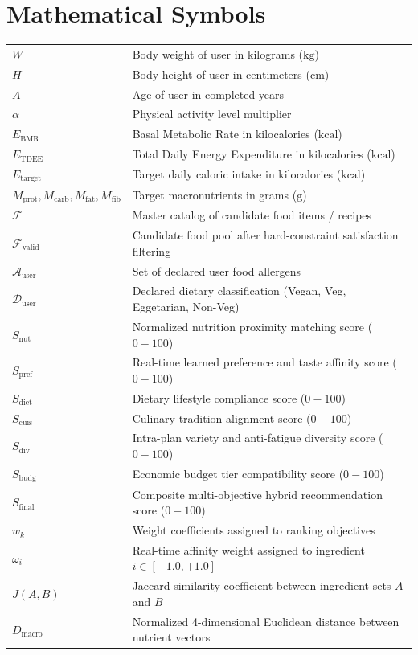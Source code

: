 \documentclass[12pt,a4paper]{report}
\begin{document}
\section*{Mathematical Symbols}
\begin{tabularx}{\textwidth}{l X}
$W$ & Body weight of user in kilograms ($\text{kg}$) \\
$H$ & Body height of user in centimeters ($\text{cm}$) \\
$A$ & Age of user in completed years \\
$\alpha$ & Physical activity level multiplier \\
$E_{\text{BMR}}$ & Basal Metabolic Rate in kilocalories ($\text{kcal}$) \\
$E_{\text{TDEE}}$ & Total Daily Energy Expenditure in kilocalories ($\text{kcal}$) \\
$E_{\text{target}}$ & Target daily caloric intake in kilocalories ($\text{kcal}$) \\
$M_{\text{prot}}, M_{\text{carb}}, M_{\text{fat}}, M_{\text{fib}}$ & Target macronutrients in grams ($\text{g}$) \\
$\mathcal{F}$ & Master catalog of candidate food items / recipes \\
$\mathcal{F}_{\text{valid}}$ & Candidate food pool after hard-constraint satisfaction filtering \\
$\mathcal{A}_{\text{user}}$ & Set of declared user food allergens \\
$\mathcal{D}_{\text{user}}$ & Declared dietary classification (Vegan, Veg, Eggetarian, Non-Veg) \\
$S_{\text{nut}}$ & Normalized nutrition proximity matching score ($0 - 100$) \\
$S_{\text{pref}}$ & Real-time learned preference and taste affinity score ($0 - 100$) \\
$S_{\text{diet}}$ & Dietary lifestyle compliance score ($0 - 100$) \\
$S_{\text{cuis}}$ & Culinary tradition alignment score ($0 - 100$) \\
$S_{\text{div}}$ & Intra-plan variety and anti-fatigue diversity score ($0 - 100$) \\
$S_{\text{budg}}$ & Economic budget tier compatibility score ($0 - 100$) \\
$S_{\text{final}}$ & Composite multi-objective hybrid recommendation score ($0 - 100$) \\
$w_k$ & Weight coefficients assigned to ranking objectives \\
$\omega_i$ & Real-time affinity weight assigned to ingredient $i \in [-1.0, +1.0]$ \\
$J(A, B)$ & Jaccard similarity coefficient between ingredient sets $A$ and $B$ \\
$D_{\text{macro}}$ & Normalized 4-dimensional Euclidean distance between nutrient vectors \\
\end{tabularx}
\end{document}
